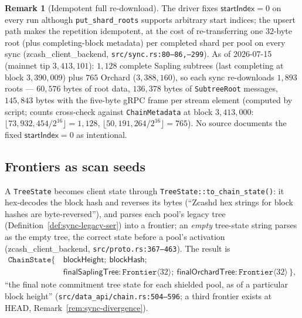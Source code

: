 \documentclass[11pt,a4paper]{article}
\theoremstyle{definition}
\newtheorem{remark}[theorem]{Remark}
\begin{document}
\begin{remark}[Idempotent full re-download]\label{rem:sync-tree-refetch}
The driver fixes $\mathsf{startIndex} = 0$ on every run although
\texttt{put\_shard\_roots} supports arbitrary start indices; the upsert
path makes the repetition idempotent, at the cost of re-transferring one
$32$-byte root (plus completing-block metadata) per completed shard per
pool on every sync
(\textsf{zcash\_client\_backend},
\texttt{src/sync.rs:80--86,--299}).
As of 2026-07-15 (mainnet tip $3{,}413{,}101$): $1{,}128$ complete
Sapling subtrees (last completing at block $3{,}390{,}009$) plus $765$
Orchard ($3{,}388{,}160$), so each sync re-downloads $1{,}893$ roots ---
$60{,}576$ bytes of root data, $136{,}378$ bytes of \texttt{SubtreeRoot}
messages, $145{,}843$ bytes with the five-byte gRPC frame per stream
element (computed by script; counts cross-check against
\texttt{ChainMetadata} at block $3{,}413{,}000$:
$\lfloor 73{,}932{,}454/2^{16}\rfloor = 1{,}128$,
$\lfloor 50{,}191{,}264/2^{16}\rfloor = 765$). No source documents the
fixed $\mathsf{startIndex}=0$ as intentional.
\end{remark}

\subsection{Frontiers as scan seeds}\label{sec:sync-tree-frontier}

A \texttt{TreeState} becomes client state through
\texttt{TreeState::to\_chain\_state()}: it hex-decodes the block hash and
reverses its bytes (``Zcashd hex strings for block hashes are
byte-reversed''), and parses each pool's legacy tree
(Definition~\ref{def:sync-legacy-ser}) into a frontier; an \emph{empty}
tree-state string parses as the empty tree, the correct state before a
pool's activation
(\textsf{zcash\_client\_backend}, \texttt{src/proto.rs:367--463}). The
result is
\[
\begin{aligned}
\texttt{ChainState}\{\,&\mathsf{blockHeight};\ \mathsf{blockHash}; \\
&\mathsf{finalSaplingTree} : \texttt{Frontier}\langle 32 \rangle;\
\mathsf{finalOrchardTree} : \texttt{Frontier}\langle 32 \rangle\,\},
\end{aligned}
\]
``the final note commitment tree state for each shielded pool, as of a
particular block height''
(\texttt{src/data\_api/chain.rs:504--596}; a third frontier exists at
HEAD, Remark~\ref{rem:sync-divergence}).
\end{document}
